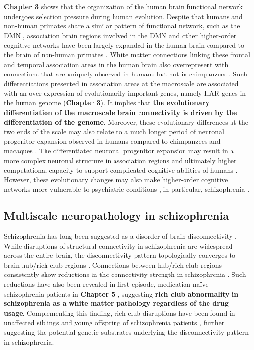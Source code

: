 \begin{refsection}
\textbf{Chapter 3} shows that the organization of the human brain functional network undergoes selection pressure during human evolution. Despite that humans and non-human primates share a similar pattern of functional network, such as the DMN \citep{mantini2011default,barks2013default}, association brain regions involved in the DMN and other higher-order cognitive networks have been largely expanded in the human brain compared to the brain of non-human primates \citep{hill2010similar,donahue2018quantitative}. White matter connections linking these frontal and temporal association areas in the human brain also overrepresent with connections that are uniquely observed in humans but not in chimpanzees \citep{ardesch2019evolutionary}. Such differentiations presented in association areas at the macroscale are associated with an over-expression of evolutionarily important genes, namely HAR genes in the human genome (\textbf{Chapter 3}). It implies that \textbf{the evolutionary differentiation of the macroscale brain connectivity is driven by the differentiation of the genome}. Moreover, these evolutionary differences at the two ends of the scale may also relate to a much longer period of neuronal progenitor expansion observed in humans compared to chimpanzees and macaques \citep{otani20162d}. The differentiated neuronal progenitor expansion may result in a more complex neuronal structure in association regions \citep{elston2001pyramidal} and ultimately higher computational capacity to support complicated cognitive abilities of humans \citep{Bianchi2013DendriticMO,Goriounova2018LargeAF,reardon2018normative}. However, these evolutionary changes may also make higher-order cognitive networks more vulnerable to psychiatric conditions \citep{Wei2019GeneticMA}, in particular, schizophrenia \citep{Heuvel2019EvolutionaryMI}.

\subsection*{Multiscale neuropathology in schizophrenia}
Schizophrenia has long been suggested as a disorder of brain disconnectivity \citep{Stephan2009DysconnectionIS,Fitzsimmons2013ReviewOF}. While disruptions of structural connectivity in schizophrenia are widespread across the entire brain, the disconnectivity pattern topologically converges to brain hub/rich-club regions \citep{Klauser2017WhiteMD}. Connections between hub/rich-club regions consistently show reductions in the connectivity strength in schizophrenia \citep{vanDenHeuvel2013AbnormalRC,Griffa2015CharacterizingTC,Klauser2017WhiteMD}. Such reductions have also been revealed in first-episode, medication-naïve schizophrenia patients in \textbf{Chapter 5} \citep{CUI2019SCZ}, suggesting \textbf{rich club abnormality in schizophrenia as a white matter pathology regardless of the drug usage}. Complementing this finding, rich club disruptions have been found in unaffected siblings \citep{Collin2014ImpairedRC} and young offspring of schizophrenia patients \citep{Collin2017AffectedAR}, further suggesting the potential genetic substrates underlying the disconnectivity pattern in schizophrenia.


\end{refsection}
